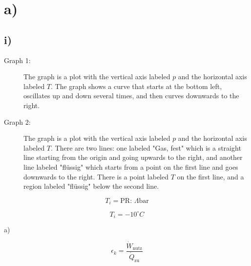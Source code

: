 

\section*{a)}

\subsection*{i)}

\begin{description}
    \item[Graph 1:] The graph is a plot with the vertical axis labeled \( p \) and the horizontal axis labeled \( T \). The graph shows a curve that starts at the bottom left, oscillates up and down several times, and then curves downwards to the right.
    \item[Graph 2:] The graph is a plot with the vertical axis labeled \( p \) and the horizontal axis labeled \( T \). There are two lines: one labeled "Gas, fest" which is a straight line starting from the origin and going upwards to the right, and another line labeled "flüssig" which starts from a point on the first line and goes downwards to the right. There is a point labeled \( T \) on the first line, and a region labeled "flüssig" below the second line.
\end{description}

\[
T_i = \text{PR: } \Lambda \text{bar}
\]

\[
T_i = -10^\circ C
\]

a)

\[
\epsilon_k = \frac{\dot{W}_{\text{nutz}}}{\dot{Q}_{\text{zu}}}
\]